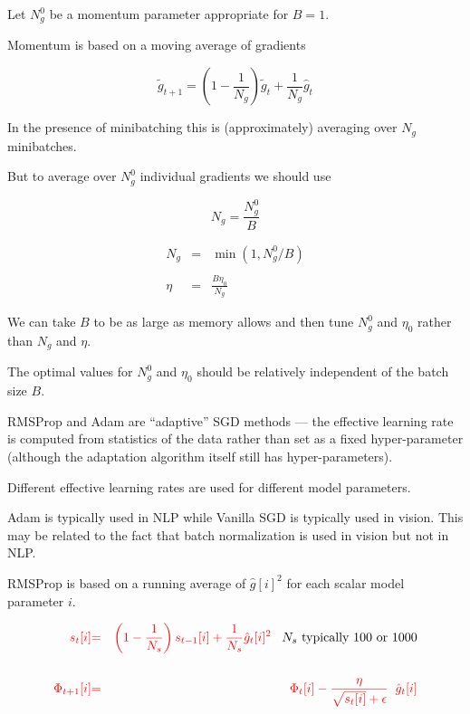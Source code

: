 {Let $N^0_g$ be a momentum parameter appropriate for $B=1$.

\vfill
Momentum is based on a moving average of gradients

$$\tilde{g}_{t+1} = \left(1-\frac{1}{N_g}\right)\tilde{g}_t + \frac{1}{N_g}\hat{g}_t$$

In the presence of minibatching this is (approximately) averaging over $N_g$ minibatches.

\vfill
But to average over $N^0_g$ individual gradients we should use

{\color{red} $$N_g = \frac{N^0_g}{B}$$}


\begin{eqnarray*}
N_g & = & \min\left(1,N^0_g/B\right) \\
\\
\eta & = & \frac{B\eta_0}{N_g}
\end{eqnarray*}

We can take $B$ to be as large as memory allows and then tune $N^0_g$ and $\eta_0$ rather than $N_g$ and $\eta$.

\vfill
The optimal values for $N^0_g$ and $\eta_0$ should be relatively independent of the batch size $B$.


RMSProp and Adam are ``adaptive'' SGD methods --- the effective learning rate is computed from statistics of the data rather than set as a fixed hyper-parameter (although
the adaptation algorithm itself still has hyper-parameters).

\vfill
Different effective learning rates are used for different model parameters.

\vfill
Adam is typically used in NLP while Vanilla SGD is typically used in vision.  This may be related to the fact that batch normalization is used in vision but not in NLP.


RMSProp is based on a running average of $\hat{g}[i]^2$ for each scalar model parameter $i$.

\begin{eqnarray*}
{\color{red} s_t[i]} & {\color{red} =} & {\color{red} \left(1-\frac{1}{N_s}\right) s_{t-1}[i] + \frac{1}{N_s} \hat{g}_t[i]^2}\;\;\;\mbox{$N_s$ typically 100 or 1000} \\
\\
{\color{red} \Phi_{t+1}[i]} & {\color{red} =} & {\color{red} \Phi_t[i] - \frac{\eta}{\sqrt{s_t[i]} + \epsilon}\;\; \hat{g}_t[i]}
\end{eqnarray*}

}
